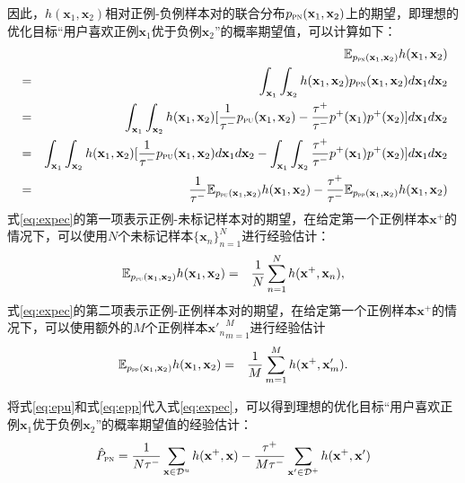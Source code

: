 因此，$h(\mathbf x_1,\mathbf x_2)$相对正例-负例样本对的联合分布$p_\textsc{pn}(\mathbf{x}_1, \mathbf{x}_2)$上的期望，即理想的优化目标“用户喜欢正例$\mathbf{x}_1$优于负例$\mathbf{x}_2$”的概率期望值，可以计算如下：
\begin{eqnarray}
	&&\mathbb{E}_{ p_\textsc{pn}(\mathbf{x}_1, \mathbf{x}_2)} h(\mathbf{x}_1,\mathbf{x}_2)\\
	&=& \int_{\mathbf{x}_1}\int_{\mathbf{x}_2}   h(\mathbf{x}_1,\mathbf{x}_2) p_\textsc{pn}(\mathbf{x}_1, \mathbf{x}_2) d{\mathbf{x}_1}d{\mathbf{x}_2} \\
	&=&\int_{\mathbf{x}_1}\int_{\mathbf{x}_2}   h(\mathbf{x}_1,\mathbf{x}_2) [\frac{1}{\tau^-}p_{\textsc{pu}}(\mathbf{x}_1, \mathbf{x}_2)- \frac{\tau^+}{\tau^-}p^+( \mathbf{x}_1) p^+(\mathbf x_2)]d{\mathbf{x}_1}d{\mathbf{x}_2} \\
	&=&\int_{\mathbf{x}_1}\int_{\mathbf{x}_2}   h(\mathbf{x}_1,\mathbf{x}_2) [\frac{1}{\tau^-}p_{\textsc{pu}}(\mathbf{x}_1, \mathbf{x}_2) d{\mathbf{x}_1}d{\mathbf{x}_2}- \int_{\mathbf{x}_1}\int_{\mathbf{x}_2} \frac{\tau^+}{\tau^-}p^+( \mathbf{x}_1) p^+(\mathbf x_2)]d{\mathbf{x}_1}d{\mathbf{x}_2} \\
	&=& \frac{1}{\tau^-}\mathbb{E}_{ p_\textsc{pu}(\mathbf{x}_1, \mathbf{x}_2)} h(\mathbf{x}_1,\mathbf{x}_2) -\frac{\tau^+}{\tau^-} \mathbb{E}_{ p_\textsc{pp}(\mathbf{x}_1, \mathbf{x}_2)} h(\mathbf{x}_1,\mathbf{x}_2) \label{eq:expec}
\end{eqnarray}
式\eqref{eq:expec}的第一项表示正例-未标记样本对的期望，在给定第一个正例样本$\mathbf{x}^+$的情况下，可以使用$N$个未标记样本$\{\mathbf{x}_n\}_{n=1}^N$进行经验估计：
\begin{eqnarray}
	\mathbb{E}_{ p_\textsc{pu}(\mathbf{x}_1, \mathbf{x}_2)} h(\mathbf{x}_1,\mathbf{x}_2) &=& \frac{1}{N} \sum_{n=1}^{N} h(\mathbf{x}^+,\mathbf{x}_n)\label{eq:epu},
\end{eqnarray}
式\eqref{eq:expec}的第二项表示正例-正例样本对的期望，在给定第一个正例样本$\mathbf{x}^+$的情况下，可以使用额外的$M$个正例样本${\mathbf{x}'_n}_{m=1}^M$进行经验估计
\begin{eqnarray}
	\mathbb{E}_{ p_\textsc{pp}(\mathbf{x}_1, \mathbf{x}_2)} h(\mathbf{x}_1,\mathbf{x}_2)  &=& \frac{1}{M} \sum_{m=1}^{M} h(\mathbf{x}^+,\mathbf{x}_m^{\prime})\label{eq:epp}.
\end{eqnarray}

将式\eqref{eq:epu}和式\eqref{eq:epp}代入式\eqref{eq:expec}，可以得到理想的优化目标“用户喜欢正例$\mathbf{x}_1$优于负例$\mathbf{x}_2$”的概率期望值的经验估计：
\begin{eqnarray}\label{eq:est}
	\hat{P}_\textsc{pn} = \frac{1}{N\tau^-}
	\sum_{\mathbf{x} \in \mathcal{D}^u}h(\mathbf{x}^+,\mathbf{x})  - \frac{\tau^+}{M\tau^-}\sum_{\mathbf{x}^\prime\in \mathcal{D}^+}h(\mathbf{x}^+, \mathbf{x}^\prime)
\end{eqnarray}

